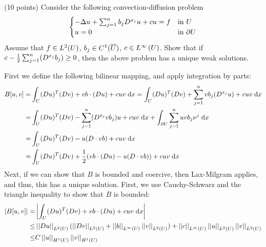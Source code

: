 (10 points)
Consider the following convection-diffusion problem
\begin{align*}
  \begin{cases}
    -\Delta u + \sum_{j = 1}^{n} b_j D^{x_j} u + c u = f & \text{in } U\\
    u = 0 & \text{in } \partial U
  \end{cases}
\end{align*}
Assume that $f \in L^2(U)$, $b_j \in C^1(\overline{U})$,
$c \in L^{\infty}\left(U \right)$.
Show that if $c - \frac{1}{2} \sum_{j = 1}^{n} (D^{x_j}b_j) \geq 0$,
then the above problem has a unique weak solutions.

First we define the following bilinear mapping, and apply integration by parts:
\begin{align*}
  B[u, v] = &\int_{\domain} (\grad u)^T (\grad v) + v b \cdot (\grad u) + c u v \dx
          = \int_{\domain} (\grad u)^T (\grad v) + \sum_{j = 1}^n v b_j (\graddir{x_j} u) + c u v \dx\\
          = &\int_{\domain} (\grad u)^T (\grad v) - \sum_{j = 1}^n (\graddir{x_j} v b_j) u + c u v \dx
             + \int_{\bndrydom} \sum_{j = 1}^n u v b_j \nu^j \dx\\
          = &\int_{\domain} (\grad u)^T (\grad v) - u (\grad \cdot v b) + c u v \dx\\
          = &\int_{\domain} (\grad u)^T (\grad v)
                          + \frac{1}{2}(v b \cdot (\grad u) - u (\grad \cdot v b))
                          + c u v \dx%
\end{align*}
Next, if we can show that $B$ is bounded and coercive, then Lax-Milgram applies,
and thus, this has a unique solution.
First, we use Cauchy-Schwarz and the triangle inequality to show that $B$ is bounded:
\begin{align*}
  |B[u, v]| = &\left|\int_{U} (D u)^T (D v) + v b \cdot (D u) +
               c u v \;\mathrm{d}x \right|\\
       \leq &\left|\left|D u\right|\right|_{L^{2}(U)} (\left|\left|D v\right|\right|_{L^{2}(U)} + \left|\left|b\right|\right|_{L^{\infty}(U)} \left|\left|v\right|\right|_{L^{2}(U)})
             + \left|\left|c\right|\right|_{L^{\infty}(U)} \left|\left|u\right|\right|_{L^{2}(U)} \left|\left|v\right|\right|_{L^{2}(U)}\\
       \leq &C \left|\left|u\right|\right|_{H^{1}(U)} \left|\left|v\right|\right|_{H^{1}(U)}
\end{align*}
